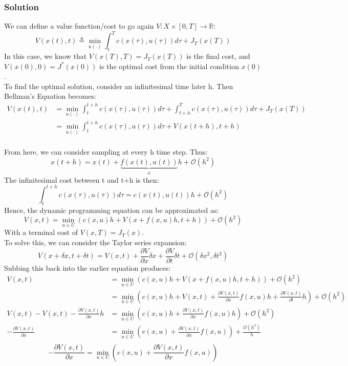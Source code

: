 \documentclass{article}
\begin{document}
\subsubsection*{Solution}
We can define a value function/cost to go again $V : X \times [0,T] \rightarrow \mathbb{R}$:
\[
V(x(t),t) \triangleq \min_{u (\cdot)} \int_t^T c(x(\tau),u(\tau)) d \tau + J_T (x(T))
\]
In this case, we know that $V(x(T),T) = J_T(x(T))$ is the final cost, and $V(x(0),0) = J^*(x(0))$ is the optimal cost from the initial condition $x(0)$.
\\
To find the optimal solution, consider an infinitesimal time later h. Then Bellman's Equation becomes:
\[
\begin{aligned}
V(x(t),t) &= \min_{u(\cdot)} \int_t^{t+h} c(x(\tau), u(\tau)) d\tau + \int_{t+h}^T c(x(\tau),u(\tau)) d\tau + J_T(x(T))
\\
&= \min_{u(\cdot)} \int_t^{t+h} c(x(\tau), u(\tau)) d\tau + V(x(t+h),t+h)
\end{aligned}
\]
\\
From here, we can consider sampling at every h time step. Thus:
\[
x(t+h) = x(t) + \underbrace{f(x(t),u(t))}_{\dot x} h + \mathcal{O}(h^2)
\]
The infinitesimal cost between t and t+h is then:
\[
\int_t^{t+h} c(x(\tau), u(\tau)) d\tau = c(x(t),u(t))h + \mathcal{O}(h^2)
\]
Hence, the dynamic programming equation can be approximated as:
\[
V(x,t) = \min_{u \in U} (c(x,u)h + V(x + f(x,u)h, t+h)) + \mathcal{O}(h^2)
\]
With a terminal cost of $V(x,T) = J_T(x)$. \\
To solve this, we can consider the Taylor series expansion:
\[
V(x + \delta x, t + \delta t) = V(x,t) + \frac{\partial V}{\partial x} \delta x + \frac{\partial V}{\partial t} \delta t + \mathcal{O}(\delta x^2, \delta t^2)
\]
Subbing this back into the earlier equation produces:
\[
\begin{aligned}
    V(x,t) &= \min_{u \in U} (c(x,u)h + V(x + f(x,u)h, t+h)) + \mathcal{O}(h^2) \\
    &= \min_{u \in U} \left( c(x,u)h + V(x,t) + \frac{\partial V(x,t)}{\partial x} f(x,u)h + \frac{\partial V(x,t)}{\partial t} h \right) + \mathcal{O}(h^2) \\ 
    V(x,t) - V(x,t) - \frac{\partial V(x,t)}{\partial x}h &= \min_{u \in U} \left( c(x,u)h  + \frac{\partial V(x,t)}{\partial x} f(x,u)h  \right) + \mathcal{O}(h^2) \\
    - \frac{\partial V(x,t)}{\partial x} &= \min_{u \in U} \left( c(x,u)  + \frac{\partial V(x,t)}{\partial x} f(x,u)  \right) + \frac{\mathcal{O}(h^2)}{h}
    \\
    \end{aligned}
\]
\begin{equation}\label{hjb}
    - \frac{\partial V(x,t)}{\partial x} = \min_{u \in U} \left( c(x,u)  + \frac{\partial V(x,t)}{\partial x} f(x,u)  \right)
    \end{equation}
\end{document}
